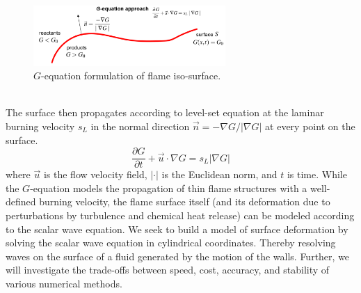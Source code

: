 \documentclass{homework}
\begin{document}
\begin{figure}[h]
    \centering
    \includegraphics[width = 0.65\textwidth]{media/FSD_G.png}
    \caption{$G$-equation formulation of flame iso-surface.}
\end{figure}
\\ \noindent
The surface then propagates according to level-set equation at the laminar burning velocity $s_L$ in the normal direction $\vec{n} =- \nabla G / |\nabla G|$ at every point on the surface.
$$\frac{\partial G}{\partial t} + \vec{u} \cdot \nabla G = s_{L}|\nabla G|$$
where $\vec{u}$ is the flow velocity field, $| \cdot |$ is the Euclidean norm, and $t$ is time.
\newpage \noindent
While the $G$-equation models the propagation of thin flame structures with a well-defined burning velocity, the flame surface itself (and its deformation due to perturbations by turbulence and chemical heat release) can be modeled according to the scalar wave equation. We seek to build a model of surface deformation by solving the scalar wave equation in cylindrical coordinates. Thereby resolving waves on the surface of a fluid generated by the motion of the walls. Further, we will investigate the trade-offs between speed, cost, accuracy, and stability of various numerical methods.
\end{document}
